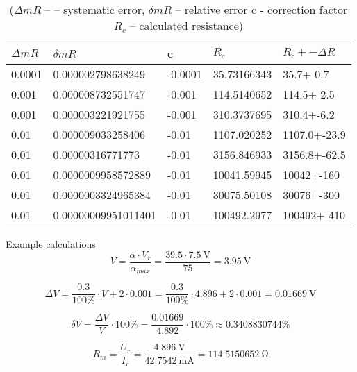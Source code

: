 \begin{table}[H]
	\centering
	\begin{tabular}{|l|l|l|l|l|}
		\hline
		$\Delta mR$ & $\delta mR$ & c & $R_c$ & $R_c+- \Delta R$ \\ \hline
		0.0001 & 0.000002798638249 & -0.0001 & 35.73166343 & 35.7+-0.7 \\ \hline
		0.001 & 0.000008732551747 & -0.001 & 114.5140652 & 114.5+-2.5 \\ \hline
		0.001 & 0.000003221921755 & -0.001 & 310.3737695 & 310.4+-6.2 \\ \hline
		0.01 & 0.000009033258406 & -0.01 & 1107.020252 & 1107.0+-23.9 \\ \hline
		0.01 & 0.00000316771773 & -0.01 & 3156.846933 & 3156.8+-62.5 \\ \hline
		0.01 & 0.0000009958572889 & -0.01 & 10041.59945 & 10042+-160 \\ \hline
		0.01 & 0.0000003324965384 & -0.01 & 30075.50108 & 30076+-300 \\ \hline
		0.01 & 0.00000009951011401 & -0.01 & 100492.2977 & 100492+-410 \\ \hline    \end{tabular}
	\caption{($\Delta mR$ -- – systematic error, $\delta mR$ -- relative error  c - correction factor  $R_c$ -- calculated resistance)}
	
\end{table}

Example calculations 
\begin{equation}
	V = \frac{\alpha\cdot V_{r}}{\alpha_{max}} = \frac{39.5\cdot \SI{7.5}{\volt}}{75} = \SI{3.95}{\volt}
	\label{eq:digital_indirect}
\end{equation}

\begin{equation}
	\Delta V = \frac{0.3}{100\unit{\percent}} \cdot V + 2 \cdot 0.001 = \frac{0.3}{100\unit{\percent}} \cdot 4.896 + 2 \cdot 0.001 = \SI{0.01669}{\volt}
	\label{eq:digital_indirect}
\end{equation}

\begin{equation}
	\delta V = \frac{\Delta V}{V}\cdot 100\unit{\percent} = \frac{0.01669}{4.892}\cdot 100\unit{\percent} \approx 0.3408830744\unit{\percent}
	\label{eq:digital_indirect}
\end{equation}

\begin{equation}
	R_m = \frac{U_r}{ I_r} = \frac{\SI{4.896}{\volt}} {\SI{42.7542}{\milli\ampere}} = \SI{114.5150652}{\ohm}
	\label{eq:digital_indirect}
\end{equation}

